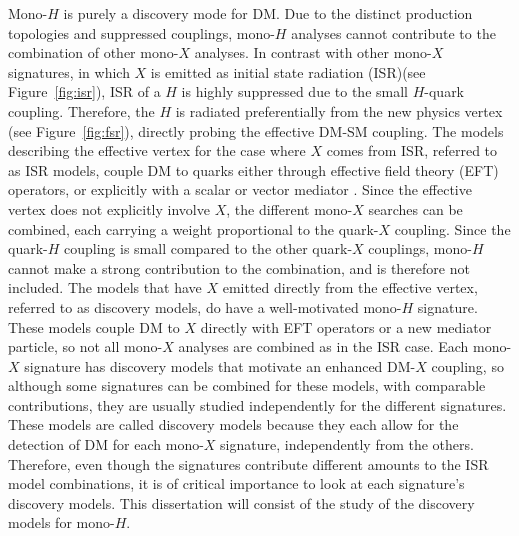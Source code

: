 \indent Mono-$H$ is purely a discovery mode for DM. Due to the distinct production topologies and suppressed couplings, mono-$H$ analyses cannot contribute to the combination of other mono-$X$ analyses. In contrast with other mono-$X$ signatures, in which $X$ is emitted as initial state radiation (ISR)(see Figure~\ref{fig:isr}), ISR of a $H$ is highly suppressed due to the small $H$-quark coupling. Therefore, the $H$ is radiated preferentially from the new physics vertex (see Figure~\ref{fig:fsr}), directly probing the effective DM-SM coupling. The models describing the effective vertex for the case where $X$ comes from ISR, referred to as ISR models, couple DM to quarks either through effective field theory (EFT) operators, or explicitly with a scalar or vector mediator \cite{Abercrombie:2015wmb}. Since the effective vertex does not explicitly involve $X$, the different mono-$X$ searches can be combined, each carrying a weight proportional to the quark-$X$ coupling. Since the quark-$H$ coupling is small compared to the other quark-$X$ couplings, mono-$H$ cannot make a strong contribution to the combination, and is therefore not included. The models that have $X$ emitted directly from the effective vertex, referred to as discovery models, do have a well-motivated mono-$H$ signature. These models couple DM to $X$ directly with EFT operators or a new mediator particle, so not all mono-$X$ analyses are combined as in the ISR case. Each mono-$X$ signature has discovery models that motivate an enhanced DM-$X$ coupling, so although some signatures can be combined for these models, with comparable contributions, they are usually studied independently for the different signatures. These models are called discovery models because they each allow for the detection of DM for each mono-$X$ signature, independently from the others. Therefore, even though the signatures contribute different amounts to the ISR model combinations, it is of critical importance to look at each signature's discovery models. This dissertation will consist of the study of the discovery models for mono-$H$. 

